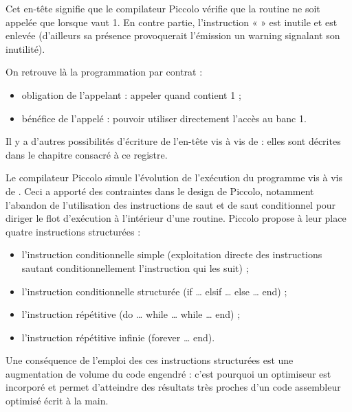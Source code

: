 Cet en-tête signifie que le compilateur Piccolo vérifie que la routine ne soit appelée que lorsque  vaut 1. En contre partie, l’instruction «  » est inutile et est enlevée (d’ailleurs sa présence provoquerait l’émission un warning signalant son inutilité).

On retrouve là la programmation par contrat :
\begin{itemize}
  \item obligation de l’appelant : appeler  quand  contient 1 ;
  \item bénéfice de l’appelé : pouvoir utiliser directement l’accès au banc 1. 
\end{itemize}

Il y a d’autres possibilités d’écriture de l’en-tête vis à vis de  : elles sont décrites dans le chapitre consacré à ce registre.

Le compilateur Piccolo simule l’évolution de l’exécution du programme vis à vis de . Ceci a apporté des contraintes dans le design de Piccolo, notamment l’abandon de l’utilisation des instructions de saut et de saut conditionnel pour diriger le flot d’exécution à l’intérieur d’une routine. Piccolo propose à leur place quatre instructions structurées :
\begin{itemize}
  \item l’instruction conditionnelle simple (exploitation directe des instructions sautant conditionnellement l’instruction qui les suit) ;
  \item l’instruction conditionnelle structurée (if … elsif … else … end) ;
  \item l’instruction répétitive (do … while … while … end) ;
  \item l’instruction répétitive infinie (forever … end).
\end{itemize}

Une conséquence de l’emploi des ces instructions structurées est une augmentation de volume du code engendré : c’est pourquoi un optimiseur est incorporé et permet d’atteindre des résultats très proches d’un code assembleur optimisé écrit à la main.
